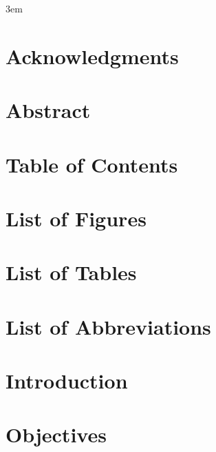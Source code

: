\documentclass[10pt,twoside]{book}
\begin{document}
\emergencystretch 3em

\frontmatter



\chapter{Acknowledgments}

\clearpage

\chapter{Abstract}

\clearpage

\chapter{Table of Contents}
\tableofcontents %
\clearpage

\chapter{List of Figures}
\listoffigures
\clearpage

\chapter{List of Tables}
\listoftables
\clearpage

\chapter{List of Abbreviations}

\clearpage

\mainmatter

\chapter{Introduction}
\clearpage


\clearpage

\chapter{Objectives}
\clearpage

% 

\end{document}
